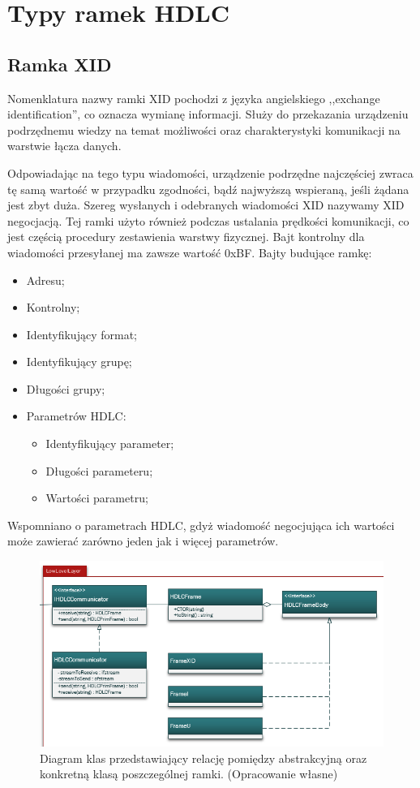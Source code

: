 \section{Typy ramek HDLC}
	\subsection{Ramka XID}
	Nomenklatura nazwy ramki XID pochodzi z języka angielskiego ,,exchange identification'', co oznacza wymianę informacji. 
	Służy do przekazania urządzeniu podrzędnemu wiedzy na temat możliwości oraz charakterystyki komunikacji na warstwie łącza danych.
	
	Odpowiadając na tego typu wiadomości, urządzenie podrzędne najczęściej zwraca tę samą wartość w przypadku zgodności, 
	bądź najwyższą wspieraną, jeśli żądana jest zbyt duża. Szereg wysłanych i odebranych wiadomości XID nazywamy XID negocjacją.
	Tej ramki użyto również podczas ustalania prędkości komunikacji, co jest częścią procedury zestawienia warstwy fizycznej.
	Bajt kontrolny dla wiadomości przesyłanej ma zawsze wartość 0xBF. \newline
	Bajty budujące ramkę:
	\begin{itemize}
		\item Adresu;
		\item Kontrolny;
		\item Identyfikujący format;
		\item Identyfikujący grupę;
		\item Długości grupy;
		\item Parametrów HDLC:
		\begin{itemize}
			\item Identyfikujący parameter;
			\item Długości parameteru;
			\item Wartości parametru;
		\end{itemize}
	\end{itemize} 
	Wspomniano o parametrach HDLC, gdyż wiadomość negocjująca ich wartości może zawierać zarówno jeden jak i więcej parametrów.

	\begin{figure}[h!]
         \centering
         \includegraphics[scale=0.75]{Obrazki/DiagramyKlas/LowLevel.png}
         \caption{Diagram klas przedstawiający relację pomiędzy abstrakcyjną oraz konkretną klasą poszczególnej ramki.
             \newline(Opracowanie własne)}
		 \label{fig:DiagramKlas_LowLevel}			 
    \end{figure}